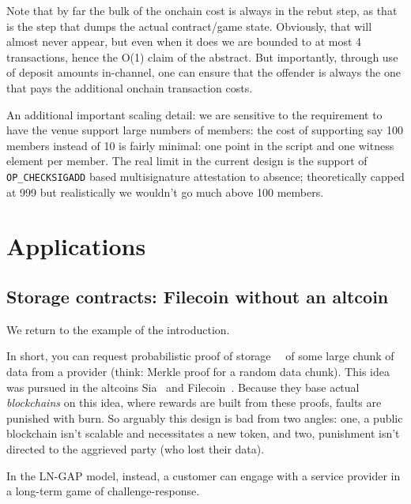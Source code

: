 \documentclass[11pt]{article}
\newcommand{\op}[1]{\texttt{OP\_#1}}
\begin{document}
Note that by far the bulk of the onchain cost is always in the rebut step, as that is the step that dumps the actual contract/game state. Obviously, that will almost never appear, but even when it does we are bounded to at most 4 transactions, hence the O(1) claim of the abstract. But importantly, through use of deposit amounts in-channel, one can ensure that the offender is always the one that pays the additional onchain transaction costs.

An additional important scaling detail: we are sensitive to the requirement to have the venue support large numbers of members: the cost of supporting say 100 members instead of 10 is fairly minimal: one point in the script and one witness element per member. The real limit in the current design is the support of \op{CHECKSIGADD} based multisignature attestation to absence; theoretically capped at 999 but realistically we wouldn't go much above 100 members.

\section{Applications}
\label{sec:apps}

\subsection{Storage contracts: Filecoin without an altcoin}
\label{sec:storage}

We return to the example of the introduction.

In short, you can request probabilistic proof of storage~\cite{jk}~\cite{sw} of some large chunk of data from a provider (think: Merkle proof for a random data chunk). This idea was pursued in the altcoins Sia~\cite{sia} and Filecoin~\cite{filecoin}. Because they base actual \emph{blockchains} on this idea, where rewards are built from these proofs, faults are punished with burn. So arguably this design is bad from two angles: one, a public blockchain isn't scalable and necessitates a new token, and two, punishment isn't directed to the aggrieved party (who lost their data).

In the LN-GAP model, instead, a customer can engage with a service provider in a long-term game of challenge-response.
\end{document}
